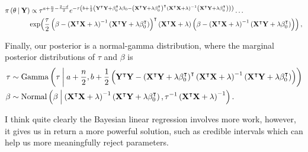 \begin{align*}
    \pi \left( \theta \:\middle|\: \mathbf{Y} \right) &\propto \tau^{a+\frac{n}{2}-\frac{2-d}{2}}e^{-\tau\left(b+\frac{1}{2}\left( \mathbf{Y}^\intercal \mathbf{Y} + \beta_0^\intercal \lambda\beta_0 - \left(\mathbf{X}^\intercal \mathbf{Y} + \lambda \beta_0^\intercal \right)^\intercal \left(\mathbf{X}^\intercal \mathbf{X} + \lambda\right)^{-1}\left(\mathbf{X}^\intercal \mathbf{Y} + \lambda \beta_0^\intercal \right)\right)\right)}\dots \\  
    & \mathrm{exp}\!\left( \frac{\tau}{2}\left(\beta - \left(\mathbf{X}^\intercal \mathbf{X} + \lambda\right)^{-1}\left(\mathbf{X}^\intercal \mathbf{Y} + \lambda \beta_0^\intercal \right)\right)^\intercal\left(\mathbf{X}^\intercal \mathbf{X} + \lambda\right)\left(\beta - \left(\mathbf{X}^\intercal \mathbf{X} + \lambda\right)^{-1}\left(\mathbf{X}^\intercal \mathbf{Y} + \lambda \beta_0^\intercal \right)\right) \right),\\
\end{align*}

Finally, our posterior is a normal-gamma distribution, where the marginal posterior distributions of $\tau$ and $\beta$ is
\begin{align*}
    \tau &\sim \mathrm{Gamma}\left(\tau \:\middle|\: a+\frac{n}{2}, b+\frac{1}{2}\left( \mathbf{Y}^\intercal \mathbf{Y} - \left(\mathbf{X}^\intercal \mathbf{Y} + \lambda \beta_0^\intercal \right)^\intercal \left(\mathbf{X}^\intercal \mathbf{X} + \lambda\right)^{-1}\left(\mathbf{X}^\intercal \mathbf{Y} + \lambda \beta_0^\intercal \right)\right)\right)\\ 
    \beta&\sim \mathrm{Normal}\left(\beta\:\middle|\: \left(\mathbf{X}^\intercal \mathbf{X} + \lambda\right)^{-1}\left(\mathbf{X}^\intercal \mathbf{Y} + \lambda \beta_0^\intercal \right), \tau^{-1}\left(\mathbf{X}^\intercal \mathbf{X} + \lambda\right)^{-1}\right).
\end{align*}

I think quite clearly the Bayesian linear regression involves more work, however, it gives us in return a more powerful solution, such as credible intervals which can help us more meaningfully reject parameters.



